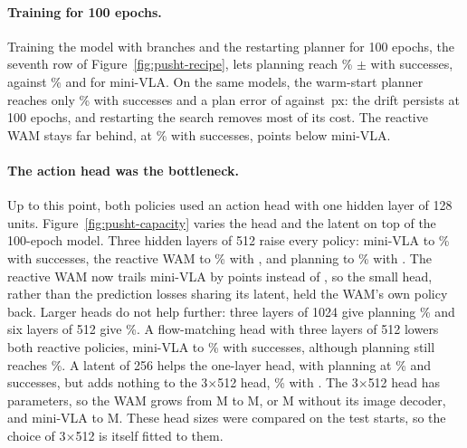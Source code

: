 \documentclass[11pt]{article}
\begin{document}
\paragraph{Training for 100 epochs.} Training the model with branches and the restarting planner for 100 epochs, the seventh row of Figure~\ref{fig:pusht-recipe}, lets planning reach \PTbranchRestartEpochsPlan\% $\pm$ \PTbranchRestartEpochsPlanSd{} with \PTbranchRestartEpochsPlanSucc{} successes, against \PTbranchRestartEpochsVla\% and \PTbranchRestartEpochsVlaSucc{} for mini-VLA. On the same models, the warm-start planner reaches only \PTbranchRestartEpochsPlanWarm\% with \PTbranchRestartEpochsPlanWarmSucc{} successes and a plan error of \PTbranchRestartEpochsPlanWarmPlanErr{} against \PTbranchRestartEpochsPlanPlanErr\,px: the drift persists at 100 epochs, and restarting the search removes most of its cost. The reactive WAM stays far behind, at \PTbranchRestartEpochsWam\% with \PTbranchRestartEpochsWamSucc{} successes, \PTbranchRestartEpochsGap{} points below mini-VLA.

\paragraph{The action head was the bottleneck.} Up to this point, both policies used an action head with one hidden layer of 128 units. Figure~\ref{fig:pusht-capacity} varies the head and the latent on top of the 100-epoch model. Three hidden layers of 512 raise every policy: mini-VLA to \PTheadBaseVla\% with \PTheadBaseVlaSucc{} successes, the reactive WAM to \PTheadBaseWam\% with \PTheadBaseWamSucc, and planning to \PTheadBasePlan\% with \PTheadBasePlanSucc. The reactive WAM now trails mini-VLA by \PTheadBaseGap{} points instead of \PTbranchRestartEpochsGap, so the small head, rather than the prediction losses sharing its latent, held the WAM's own policy back. Larger heads do not help further: three layers of 1024 give planning \PTheadWidePlan\% and six layers of 512 give \PTheadDeepPlan\%. A flow-matching head with three layers of 512 lowers both reactive policies, mini-VLA to \PTheadFlowVla\% with \PTheadFlowVlaSucc{} successes, although planning still reaches \PTheadFlowPlan\%. A latent of 256 helps the one-layer head, with planning at \PTlatentWidePlan\% and \PTlatentWidePlanSucc{} successes, but adds nothing to the 3$\times$512 head, \PTheadLatentPlan\% with \PTheadLatentPlanSucc. The 3$\times$512 head has \PTheadBaseParamsHead{} parameters, so the WAM grows from \PTbranchRestartEpochsParamsWamM M to \PTheadBaseParamsWamM M, or \PTheadBaseParamsNodecM M without its image decoder, and mini-VLA to \PTheadBaseParamsVlaM M. These head sizes were compared on the test starts, so the choice of 3$\times$512 is itself fitted to them.
\end{document}
